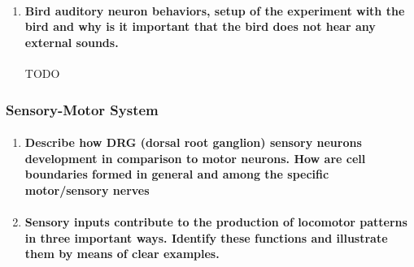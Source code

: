 \documentclass[12pt,article,oneside,a4paper]{memoir}
\begin{document}
\begin{enumerate}
\item \paragraph{Bird auditory neuron behaviors, setup of the experiment with the bird and why is it important that the bird does not hear any external sounds.}
TODO

\end{enumerate}

\subsubsection{Sensory-Motor System}
\begin{enumerate}
\item \paragraph{Describe how DRG (dorsal root ganglion) sensory neurons development in comparison to motor neurons. How are cell boundaries formed in general and among the specific motor/sensory nerves}

\item \paragraph{Sensory inputs contribute to the production of locomotor patterns in three important ways. Identify these functions and illustrate them by means of clear examples.}

\end{enumerate}

\end{document}
